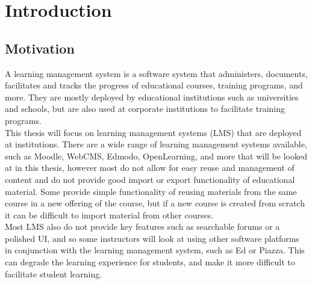 \chapter{Introduction}\label{ch:intro}

\section{Motivation}
A learning management system is a software system that administers, documents, facilitates and tracks the progress of educational courses, training programs, and more. They are mostly deployed by educational institutions such as universities and schools, but are also used at corporate institutions to facilitate training programs.\cite{lmsdefinition} \\

This thesis will focus on learning management systems (LMS) that are deployed at institutions. There are a wide range of learning management systems available, such as Moodle, WebCMS, Edmodo, OpenLearning, and more that will be looked at in this thesis, however most do not allow for easy reuse and management of content and do not provide good import or export functionality of educational material. Some provide simple functionality of reusing materials from the same course in a new offering of the course, but if a new course is created from scratch it can be difficult to import material from other courses.\\

Most LMS also do not provide key features such as searchable forums or a polished UI, and so some instructors will look at using other software platforms in conjunction with the learning management system, such as Ed or Piazza. This can degrade the learning experience for students, and make it more difficult to facilitate student learning.\\


